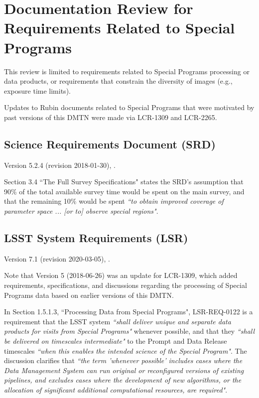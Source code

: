 \section{Documentation Review for Requirements Related to Special Programs}\label{sec:docrev}

This review is limited to requirements related to Special Programs processing or data products,
or requirements that constrain the diversity of images (e.g., exposure time limits).

Updates to Rubin documents related to Special Programs that were motivated by past versions of this DMTN
were made via LCR-1309 and LCR-2265. 



\subsection{Science Requirements Document (SRD)}

Version 5.2.4 (revision 2018-01-30), .

Section 3.4 ``The Full Survey Specifications" states the SRD's assumption that 90\% of the total 
available survey time would be spent on the main survey, and that the remaining 10\% would be spent 
{\it ``to obtain improved coverage of parameter space ... [or to] observe special regions"}.



\subsection{LSST System Requirements (LSR)}

Version 7.1 (revision 2020-03-05), .

Note that Version 5 (2018-06-26) was an update for LCR-1309, which added requirements, specifications, 
and discussions regarding the processing of Special Programs data based on earlier versions of this DMTN.

In Section 1.5.1.3, ``Processing Data from Special Programs", LSR-REQ-0122 is a requirement 
that the LSST system {\it ``shall deliver unique and separate data products for visits from Special Programs"} 
whenever possible, and that they {\it ``shall be delivered on timescales intermediate"} to the Prompt and 
Data Release timescales {\it ``when this enables the intended science of the Special Program"}.
The discussion clarifies that {\it ``the term 'whenever possible' includes cases where the Data Management System 
can run original or reconfigured versions of existing pipelines, and excludes cases where the development of new 
algorithms, or the allocation of significant additional computational resources, are required"}.

